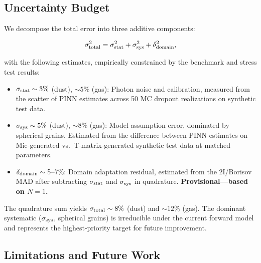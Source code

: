 \documentclass[preprint2]{aastex631}
\begin{document}
\subsection{Uncertainty Budget}\label{sec:uncertainty_budget}

We decompose the total error into three additive components:

\begin{equation}
\sigma_{\rm total}^2 = \sigma_{\rm stat}^2 + \sigma_{\rm sys}^2 + \delta_{\rm domain}^2,
\end{equation}

with the following estimates, empirically constrained by the benchmark and stress test results:

\begin{itemize}
    \item $\sigma_{\rm stat} \sim 3\%$ (dust), $\sim 5\%$ (gas): Photon noise and calibration, measured from the scatter of PINN estimates across 50 MC dropout realizations on synthetic test data.
    \item $\sigma_{\rm sys} \sim 5\%$ (dust), $\sim 8\%$ (gas): Model assumption error, dominated by spherical grains. Estimated from the difference between PINN estimates on Mie-generated vs.\ T-matrix-generated synthetic test data at matched parameters.
    \item $\delta_{\rm domain} \sim 5$--7\%: Domain adaptation residual, estimated from the 2I/Borisov MAD after subtracting $\sigma_{\rm stat}$ and $\sigma_{\rm sys}$ in quadrature. \textbf{Provisional---based on $N=1$.}
\end{itemize}

The quadrature sum yields $\sigma_{\rm total} \sim 8\%$ (dust) and $\sim 12\%$ (gas). The dominant systematic ($\sigma_{\rm sys}$, spherical grains) is irreducible under the current forward model and represents the highest-priority target for future improvement.

\subsection{Limitations and Future Work}
\end{document}
